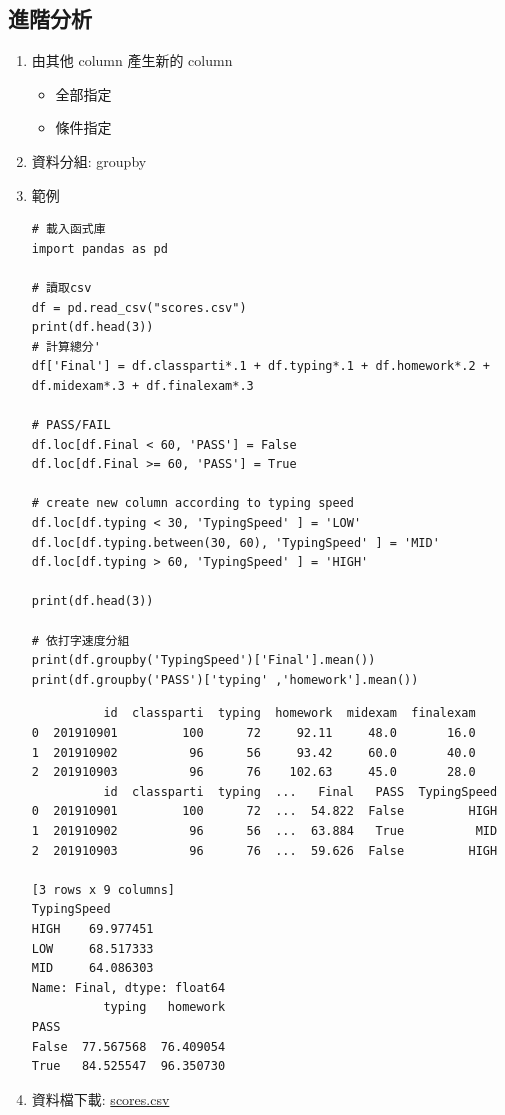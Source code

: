 \documentclass[a4paper,12pt]{article}
\begin{document}
\subsection{進階分析}
\label{sec:orgc413478}
\begin{enumerate}
\item 由其他 column 產生新的 column
\label{sec:orgac86a66}
\begin{itemize}
\item 全部指定\\
\item 條件指定\\
\end{itemize}
\item 資料分組: groupby
\label{sec:org791c67a}
\item 範例
\label{sec:org9da7f07}
\lstset{breaklines=true,language=Python,label= ,caption= ,captionpos=b,firstnumber=1,numbers=left}
\begin{lstlisting}
# 載入函式庫
import pandas as pd

# 讀取csv
df = pd.read_csv("scores.csv")
print(df.head(3))
# 計算總分'
df['Final'] = df.classparti*.1 + df.typing*.1 + df.homework*.2 + df.midexam*.3 + df.finalexam*.3

# PASS/FAIL
df.loc[df.Final < 60, 'PASS'] = False
df.loc[df.Final >= 60, 'PASS'] = True

# create new column according to typing speed
df.loc[df.typing < 30, 'TypingSpeed' ] = 'LOW'
df.loc[df.typing.between(30, 60), 'TypingSpeed' ] = 'MID'
df.loc[df.typing > 60, 'TypingSpeed' ] = 'HIGH'

print(df.head(3))

# 依打字速度分組
print(df.groupby('TypingSpeed')['Final'].mean())
print(df.groupby('PASS')['typing' ,'homework'].mean())

\end{lstlisting}

\begin{verbatim}
          id  classparti  typing  homework  midexam  finalexam
0  201910901         100      72     92.11     48.0       16.0
1  201910902          96      56     93.42     60.0       40.0
2  201910903          96      76    102.63     45.0       28.0
          id  classparti  typing  ...   Final   PASS  TypingSpeed
0  201910901         100      72  ...  54.822  False         HIGH
1  201910902          96      56  ...  63.884   True          MID
2  201910903          96      76  ...  59.626  False         HIGH

[3 rows x 9 columns]
TypingSpeed
HIGH    69.977451
LOW     68.517333
MID     64.086303
Name: Final, dtype: float64
          typing   homework
PASS                       
False  77.567568  76.409054
True   84.525547  96.350730
\end{verbatim}

\item 資料檔下載: \url{scores.csv}
\label{sec:org6bee7f7}
\end{enumerate}
\end{document}
